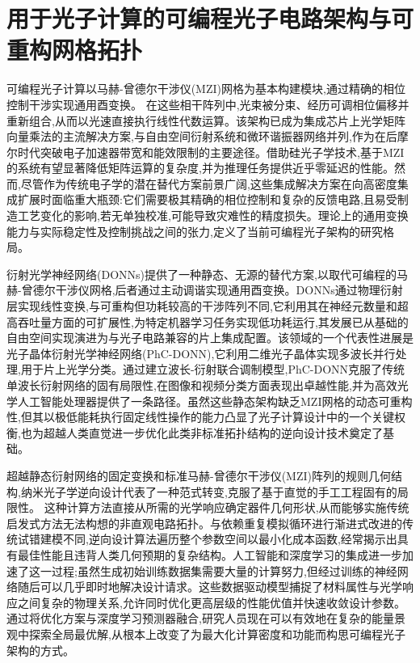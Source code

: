 \documentclass[11pt]{article}
\begin{document}
\section{用于光子计算的可编程光子电路架构与可重构网格拓扑}\label{ux7528ux4e8eux5149ux5b50ux8ba1ux7b97ux7684ux53efux7f16ux7a0bux5149ux5b50ux7535ux8defux67b6ux6784ux4e0eux53efux91cdux6784ux7f51ux683cux62d3ux6251}

可编程光子计算以马赫-曾德尔干涉仪(MZI)网格为基本构建模块,通过精确的相位控制干涉实现通用酉变换。\citep{doi_10_48550_arxiv_2407_03235_fe345c4b} \citep{doi_10_1063_5_0235712_fb28986d} 在这些相干阵列中,光束被分束、经历可调相位偏移并重新组合,从而以光速直接执行线性代数运算。该架构已成为集成芯片上光学矩阵向量乘法的主流解决方案,与自由空间衍射系统和微环谐振器网络并列,作为在后摩尔时代突破电子加速器带宽和能效限制的主要途径。借助硅光子学技术,基于MZI的系统有望显著降低矩阵运算的复杂度,并为推理任务提供近乎零延迟的性能。然而,尽管作为传统电子学的潜在替代方案前景广阔,这些集成解决方案在向高密度集成扩展时面临重大瓶颈:它们需要极其精确的相位控制和复杂的反馈电路,且易受制造工艺变化的影响,若无单独校准,可能导致灾难性的精度损失。理论上的通用变换能力与实际稳定性及控制挑战之间的张力,定义了当前可编程光子架构的研究格局。\citep{doi_10_1109_tnano_2022_3223915_d4da3e6b} \citep{doi_10_1088_1402_4896_ae8345_3b948559}

衍射光学神经网络(DONNs)提供了一种静态、无源的替代方案,以取代可编程的马赫-曾德尔干涉仪网格,后者通过主动调谐实现通用酉变换。DONNs通过物理衍射层实现线性变换,与可重构但功耗较高的干涉阵列不同,它利用其在神经元数量和超高吞吐量方面的可扩展性,为特定机器学习任务实现低功耗运行,其发展已从基础的自由空间实现演进为与光子电路兼容的片上集成配置。该领域的一个代表性进展是光子晶体衍射光学神经网络(PhC-DONN),它利用二维光子晶体实现多波长并行处理,用于片上光学分类。通过建立波长-衍射联合调制模型,PhC-DONN克服了传统单波长衍射网络的固有局限性,在图像和视频分类方面表现出卓越性能,并为高效光学人工智能处理器提供了一条路径。虽然这些静态架构缺乏MZI网格的动态可重构性,但其以极低能耗执行固定线性操作的能力凸显了光子计算设计中的一个关键权衡,也为超越人类直觉进一步优化此类非标准拓扑结构的逆向设计技术奠定了基础。\citep{doi_10_1002_nap2_70098_8d5f2f8a} \citep{doi_10_1515_nanoph_2025_0168_86a0f7aa}

超越静态衍射网络的固定变换和标准马赫-曾德尔干涉仪(MZI)阵列的规则几何结构,纳米光子学逆向设计代表了一种范式转变,克服了基于直觉的手工工程固有的局限性。\citep{doi_10_1088_1361_6633_ae7f9a_e05f9b1d} \citep{doi_10_1109_icufn61752_2024_10625552_985a60f2} 这种计算方法直接从所需的光学响应确定器件几何形状,从而能够实施传统启发式方法无法构想的非直观电路拓扑。与依赖重复模拟循环进行渐进式改进的传统试错建模不同,逆向设计算法遍历整个参数空间以最小化成本函数,经常揭示出具有最佳性能且违背人类几何预期的复杂结构。人工智能和深度学习的集成进一步加速了这一过程;虽然生成初始训练数据集需要大量的计算努力,但经过训练的神经网络随后可以几乎即时地解决设计请求。这些数据驱动模型捕捉了材料属性与光学响应之间复杂的物理关系,允许同时优化更高层级的性能优值并快速收敛设计参数。通过将优化方案与深度学习预测器融合,研究人员现在可以有效地在复杂的能量景观中探索全局最优解,从根本上改变了为最大化计算密度和功能而构思可编程光子架构的方式。\citep{doi_10_1515_nanoph_2021_0660_2d91a441} \citep{doi_10_1515_nanoph_2018_0183_d85e9193}
\end{document}
